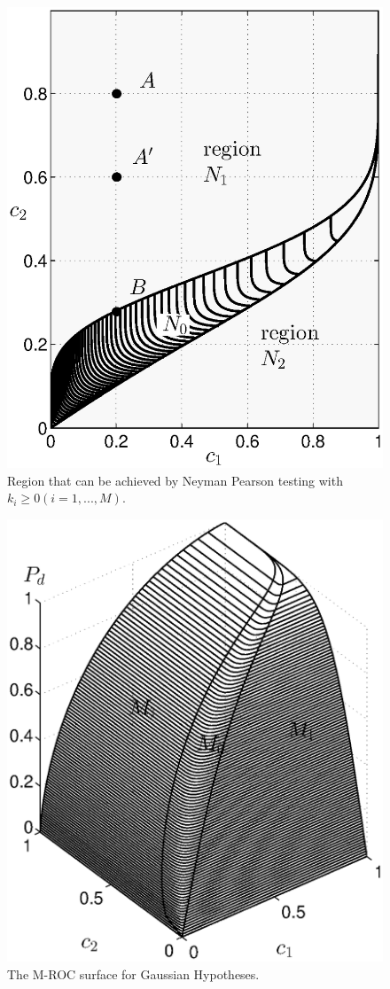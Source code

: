 \documentclass[12pt,journal,a4paper,twoside,onecolumn]{IEEEtran}
\begin{document}
\begin{spacing}{2.5}
\begin{figure}[!t]
\centering
\includegraphics[width=12cm]{singlecontour.eps}
\caption{Region that can be achieved by Neyman Pearson testing with $k_i \geq 0 (i=1, ..., M)$.}
\label{pic: contour for m0 gaussian}
\end{figure}

\begin{figure}[!t]
\centering
\includegraphics[width=12cm]{ROC2.eps}
\caption{The M-ROC surface for Gaussian Hypotheses.}
\label{pic: LJS}
\end{figure}


\end{spacing}
\end{document}
